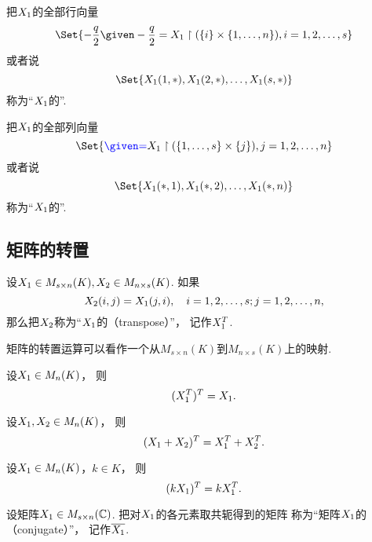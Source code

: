 把\(X_1\)的全部行向量\[
	\Set{ \a \given \a=\A\setrestrict(\{i\}\times\{1,\dotsc,n\}), i=1,2,\dotsc,s }
\]或者说\[
	\Set{\MatrixEntry\A{1,*},\MatrixEntry\A{2,*},\dotsc,\MatrixEntry\A{s,*}}
\]
称为“\(X_1\)的”.

把\(X_1\)的全部列向量\[
	\Set{ \b \given \b=\A\setrestrict(\{1,\dotsc,s\}\times\{j\}), j=1,2,\dotsc,n }
\]或者说\[
	\Set{\MatrixEntry\A{*,1},\MatrixEntry\A{*,2},\dotsc,\MatrixEntry\A{*,n}}
\]
称为“\(X_1\)的”.

\subsection{矩阵的转置}
\begin{definition}
设\(X_1\in M_{s \times n}(K),
X_2\in M_{n \times s}(K)\).
如果\[
	X_2(i,j)=X_1(j,i),
	\quad i=1,2,\dotsc,s;j=1,2,\dotsc,n,
\]
那么把\(X_2\)称为“\(X_1\)的（transpose）”，
记作\(X_1^T\).
\end{definition}
\begin{remark}
矩阵的转置运算可以看作一个从\(M_{s \times n}(K)\)到\(M_{n \times s}(K)\)上的映射.
\end{remark}

\begin{property}\label{theorem:矩阵的转置.性质1}
设\(X_1 \in M_n(K)\)，
则\begin{equation}
	(X_1^T)^T = X_1.
\end{equation}
\end{property}

\begin{property}\label{theorem:矩阵的转置.性质2}
设\(X_1,X_2 \in M_n(K)\)，
则\begin{equation}
	(X_1+X_2)^T = X_1^T + X_2^T.
\end{equation}
\end{property}

\begin{property}\label{theorem:矩阵的转置.性质3}
设\(X_1 \in M_n(K)\)，\(k \in K\)，
则\begin{equation}
	(k X_1)^T = k X_1^T.
\end{equation}
\end{property}

\begin{definition}
设矩阵\(X_1 \in M_{s \times n}(\mathbb{C})\).
把对\(X_1\)的各元素取共轭得到的矩阵
称为“矩阵\(X_1\)的（conjugate）”，
记作\(\overline{X_1}\).
\end{definition}

